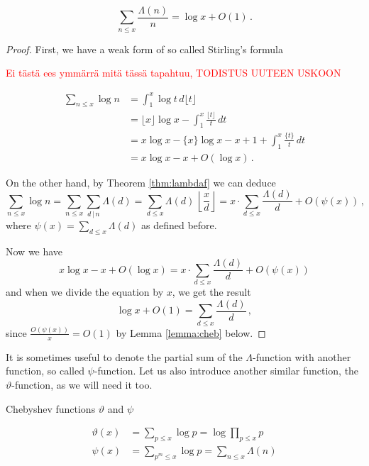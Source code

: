 \documentclass{article}
\begin{document}
\begin{lemma}
\label{lemma:lambdadd}
\begin{equation*}
    \sum_{n\leq x} \frac{\Lambda(n)}{n} = \log x + O(1)\,.
\end{equation*}
\begin{proof}
First, we have a weak form of so called Stirling's formula \cite{Goldmakher}

\textcolor{red}{Ei tästä ees ymmärrä mitä tässä tapahtuu, TODISTUS UUTEEN USKOON}

\begin{align*}
    \sum_{n\leq x} \log n & = \int_1^x \log t\,d\lfloor t\rfloor\\
    & = \lfloor x\rfloor\log x - \int_1^x \frac{\lfloor t \rfloor}{t}\,dt\\
    & = x\log x - \{x\}\log x - x + 1 + \int_1^x \frac{\{t\}}{t}\,dt\\
    & = x\log x - x + O(\log x)\,.
\end{align*}

On the other hand, by Theorem \ref{thm:lambdaf} we can deduce
\begin{equation*}
    \sum_{n\leq x} \log n = \sum_{n\leq x} \sum_{d\,\vert\, n} \Lambda(d) = \sum_{d\leq x} \Lambda(d)\,\left\lfloor \frac{x}{d}\right\rfloor = x\cdot\sum_{d\leq x} \frac{\Lambda(d)}{d} + O(\psi(x))\,,
\end{equation*}
where $\psi(x)=\sum_{d\leq x} \Lambda(d)$ as defined before.

Now we have
\begin{equation*}
    x\log x - x + O(\log x) = x\cdot\sum_{d\leq x} \frac{\Lambda(d)}{d} + O(\psi(x))
\end{equation*}
and when we divide the equation by $x$, we get the result
\begin{equation*}
    \log x + O(1) = \sum_{d\leq x} \frac{\Lambda(d)}{d}\,,
\end{equation*}
since $\frac{O(\psi(x))}{x}=O(1)$ by Lemma \ref{lemma:cheb} below.
\end{proof}
\end{lemma}

It is sometimes useful to denote the partial sum of the $\Lambda$-function with another function, so called $\psi$-function. Let us also introduce another similar function, the $\vartheta$-function, as we will need it too.

\begin{definition}
Chebyshev functions $\vartheta$ and $\psi$

\begin{align*}
     \vartheta(x) & = \sum_{p\leq x} \log p = \log \prod_{p\leq x} p\\
    \psi(x) & = \sum_{p^m\leq x} \log p = \sum_{n\leq x} \Lambda(n)
\end{align*}
\end{definition}
\end{document}
